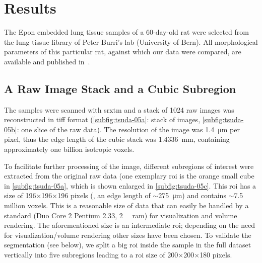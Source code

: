\section{Results}
The Epon embedded lung tissue samples of a 60-day-old rat were selected from the lung tissue library of Peter Burri's lab (University of Bern). All morphological parameters of this particular rat, against which our data were compared, are available and published in~\citet{Tschanz2003}.

\subsection{A Raw Image Stack and a Cubic Subregion}
The samples were scanned with \ac{srxtm} and a stack of 1024 raw images was reconstructed in tiff format (\autoref{subfig:tsuda-05a}: stack of images, \ref{subfig:tsuda-05b}: one slice of the raw data). The resolution of the image was \SI{1.4}{\micro\meter} per pixel, thus the edge length of the cubic stack was \SI{1.4336}{\milli\meter}, containing approximately one billion isotropic voxels.

To facilitate further processing of the image, different subregions of interest were extracted from the original raw data (one exemplary \ac{roi} is the orange small cube in \autoref{subfig:tsuda-05a}, which is shown enlarged in \autoref{subfig:tsuda-05c}. This \ac{roi} has a size of 196$\times$196$\times$196 pixels (\ie, an edge length of $\sim$\SI{275}{\micro\meter}) and contains $\sim$7.5 million voxels. This is a reasonable size of data that can easily be handled by a standard  (Duo Core 2 Pentium \SI{2.33}{\gigahertz}, \SI{2}{\giga\byte} \acs{ram}) for visualization and volume rendering. The aforementioned size is an intermediate \ac{roi}; depending on the need for visualization/volume rendering other sizes have been chosen. To validate the segmentation (see below), we split a big \ac{roi} inside the sample in the full dataset vertically into five subregions leading to a \ac{roi} size of 200$\times$200$\times$180 pixels.

